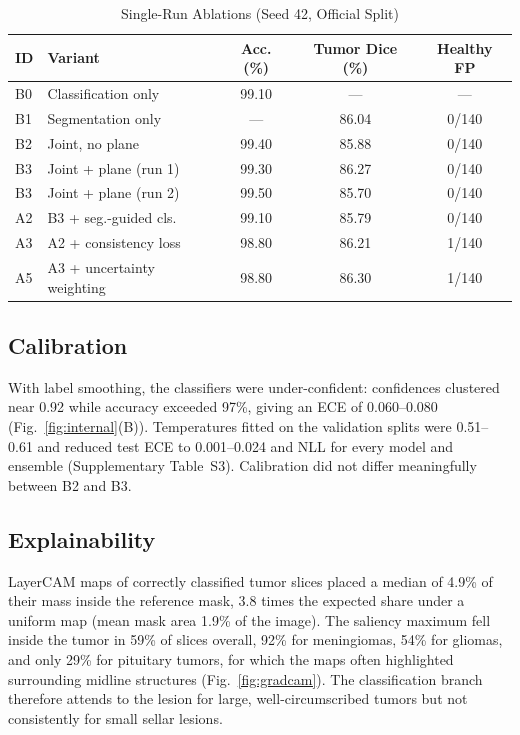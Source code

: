 \documentclass[journal]{IEEEtran}
\begin{document}
\begin{table}[!t]
\caption{Single-Run Ablations (Seed 42, Official Split)}
\label{tab:ablations}
\centering
\footnotesize
\setlength{\tabcolsep}{3pt}
\begin{tabular}{llccc}
\toprule
ID & Variant & Acc. (\%) & Tumor Dice (\%) & Healthy FP \\
\midrule
B0 & Classification only & 99.10 & --- & --- \\
B1 & Segmentation only & --- & 86.04 & 0/140 \\
B2 & Joint, no plane & 99.40 & 85.88 & 0/140 \\
B3 & Joint + plane (run 1) & 99.30 & 86.27 & 0/140 \\
B3 & Joint + plane (run 2) & 99.50 & 85.70 & 0/140 \\
A2 & B3 + seg.-guided cls. & 99.10 & 85.79 & 0/140 \\
A3 & A2 + consistency loss & 98.80 & 86.21 & 1/140 \\
A5 & A3 + uncertainty weighting & 98.80 & 86.30 & 1/140 \\
\bottomrule
\end{tabular}
\end{table}

\subsection{Calibration}
With label smoothing, the classifiers were under-confident: confidences clustered near 0.92 while accuracy exceeded 97\%, giving an ECE of 0.060--0.080 (Fig.~\ref{fig:internal}(B)). Temperatures fitted on the validation splits were 0.51--0.61 and reduced test ECE to 0.001--0.024 and NLL for every model and ensemble (Supplementary Table~S3). Calibration did not differ meaningfully between B2 and B3.

\subsection{Explainability}
LayerCAM maps of correctly classified tumor slices placed a median of 4.9\% of their mass inside the reference mask, 3.8 times the expected share under a uniform map (mean mask area 1.9\% of the image). The saliency maximum fell inside the tumor in 59\% of slices overall, 92\% for meningiomas, 54\% for gliomas, and only 29\% for pituitary tumors, for which the maps often highlighted surrounding midline structures (Fig.~\ref{fig:gradcam}). The classification branch therefore attends to the lesion for large, well-circumscribed tumors but not consistently for small sellar lesions.
\end{document}
